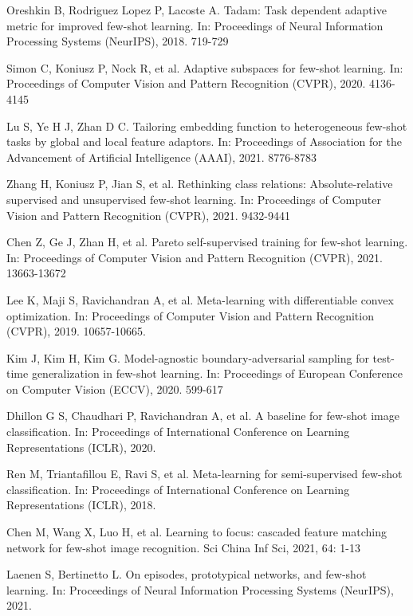 \documentclass{SCIS2019}
\begin{document}
\begin{thebibliography}{99}
	 Oreshkin B, Rodriguez Lopez P, Lacoste A. Tadam: Task dependent adaptive metric for improved few-shot learning. In: Proceedings of Neural Information Processing Systems (NeurIPS), 2018. 719-729
	
	 Simon C, Koniusz P, Nock R, et al. Adaptive subspaces for few-shot learning. In: Proceedings of Computer Vision and Pattern Recognition (CVPR), 2020. 4136-4145
	
	 Lu S, Ye H J, Zhan D C. Tailoring embedding function to heterogeneous few-shot tasks by global and local feature adaptors. In: Proceedings of Association for the Advancement of Artificial Intelligence (AAAI), 2021. 8776-8783
	
	 Zhang H, Koniusz P, Jian S, et al. Rethinking class relations: Absolute-relative supervised and unsupervised few-shot learning. In: Proceedings of Computer Vision and Pattern Recognition (CVPR), 2021. 9432-9441
	
	 Chen Z, Ge J, Zhan H, et al. Pareto self-supervised training for few-shot learning. In: Proceedings of Computer Vision and Pattern Recognition (CVPR), 2021. 13663-13672
	
	 Lee K, Maji S, Ravichandran A, et al. Meta-learning with differentiable convex optimization. In: Proceedings of Computer Vision and Pattern Recognition (CVPR), 2019. 10657-10665.
	
	 Kim J, Kim H, Kim G. Model-agnostic boundary-adversarial sampling for test-time generalization in few-shot learning. In: Proceedings of European Conference on Computer Vision (ECCV), 2020. 599-617
	
	 Dhillon G S, Chaudhari P, Ravichandran A, et al. A baseline for few-shot image classification. In: Proceedings of International Conference on Learning Representations (ICLR), 2020.
	
	 Ren M, Triantafillou E, Ravi S, et al. Meta-learning for semi-supervised few-shot classification. In: Proceedings of International Conference on Learning Representations (ICLR), 2018.
	
	 Chen M, Wang X, Luo H, et al. Learning to focus: cascaded feature matching network for few-shot image recognition. Sci China Inf Sci, 2021, 64: 1-13
	
	 Laenen S, Bertinetto L. On episodes, prototypical networks, and few-shot learning. In: Proceedings of Neural Information Processing Systems (NeurIPS), 2021.
	

\end{thebibliography}
\end{document}
